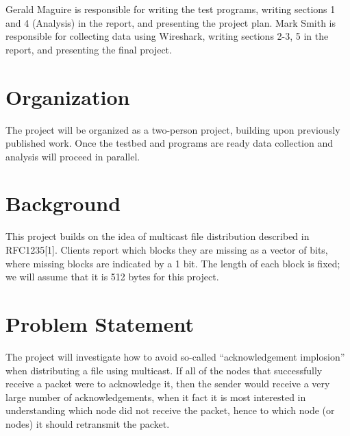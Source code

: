 \documentclass[12pt,twoside]{article}
\begin{document}
Gerald Maguire is responsible for writing the test programs, writing sections 1 and 4 (Analysis) in the report, and presenting the project plan.
Mark Smith is responsible for collecting data using Wireshark, writing sections 2-3, 5 in the report, and presenting the final project.

\section{Organization}
\label{sec:organization}


The project will be organized as a two-person project, building upon previously published work. Once the testbed and programs are ready data collection and analysis will proceed in parallel.

\section{Background}
\label{sec:background}


This project builds on the idea of multicast file distribution described in RFC1235[1]. Clients report which blocks they are missing as a vector of bits, where missing blocks are indicated by a 1 bit. The length of each block is fixed; we will assume that it is 512 bytes for this project.


\section{Problem Statement}
\label{sec:problem-statement}


The project will investigate how to avoid so-called “acknowledgement implosion” when distributing a file using multicast. If all of the nodes that successfully receive a packet were to acknowledge it, then the sender would receive a very large number of acknowledgements, when it fact it is most interested in understanding which node did not receive the packet, hence to which node (or nodes) it should retransmit the packet.
\end{document}
